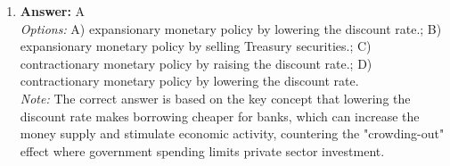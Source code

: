 \documentclass[12pt]{article}
\begin{document}
\begin{enumerate}[label=\arabic*.]
\\ \textit{Note:} The correct answer is based on the principle that when the world price of rice is lower than the domestic price, U.S. consumers will prefer the cheaper imported rice, leading to an increase in imports to satisfy domestic demand and address the resulting shortfall in local supply.
\item \textbf{Answer:} A
\\ \textit{Options:} A) expansionary monetary policy by lowering the discount rate.; B) expansionary monetary policy by selling Treasury securities.; C) contractionary monetary policy by raising the discount rate.; D) contractionary monetary policy by lowering the discount rate.
\\ \textit{Note:} The correct answer is based on the key concept that lowering the discount rate makes borrowing cheaper for banks, which can increase the money supply and stimulate economic activity, countering the "crowding-out" effect where government spending limits private sector investment.
\end{enumerate}
\end{document}
